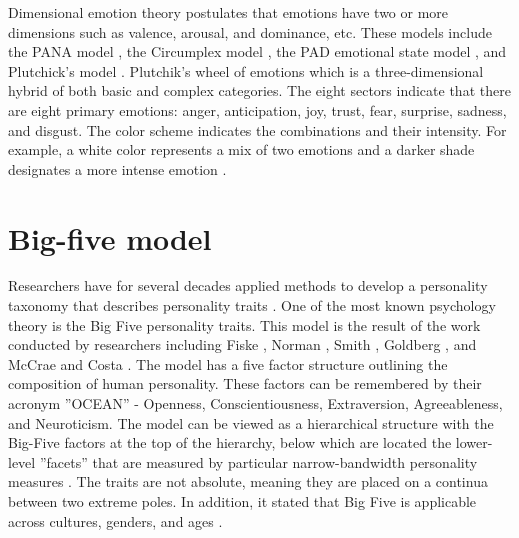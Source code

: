 Dimensional emotion theory postulates that emotions have two or more dimensions such as valence, arousal, and dominance, etc. These models include the PANA model \cite{emotions7-watson1985toward}, the Circumplex model \cite{emotions8-russell1980circumplex}, the PAD emotional state model \cite{emotions9-mehrabian1995framework}, and Plutchick’s model \cite{plutchik_model}. Plutchik's wheel of emotions which is a three-dimensional hybrid of both basic and complex categories. The eight sectors indicate that there are eight primary emotions: anger, anticipation, joy, trust, fear, surprise, sadness, and disgust. The color scheme indicates the combinations and their intensity. For example, a white color represents a mix of two emotions and a darker shade designates a more intense emotion \cite{HP_RPP}.

\section{Big-five model}
Researchers have for several decades applied methods to develop a personality taxonomy that describes personality traits \cite{personality_goldberg_1990}. One of the most known psychology theory is the Big Five personality traits. This model is the result of the work conducted by researchers including Fiske \cite{fiske1949consistency}, Norman \cite{norman19672800}, Smith \cite{smith1967usefulness}, Goldberg \cite{goldberg1981language}, and McCrae and Costa \cite{mccrae1987validation}. The model has a five factor structure outlining the composition of human personality. These factors can be remembered by their acronym ''OCEAN'' - Openness, Conscientiousness, Extraversion, Agreeableness, and Neuroticism. The model can be viewed as a hierarchical structure with the Big-Five factors at the top of the hierarchy, below which are located the lower-level ''facets'' that are measured by particular narrow-bandwidth personality measures \cite{Bandwidth-goldberg1999broad}. The traits are not absolute, meaning they are placed on a continua between two extreme poles. In addition, it stated that Big Five is applicable across cultures, genders, and ages \cite{big-five-john1999big}.  
%
